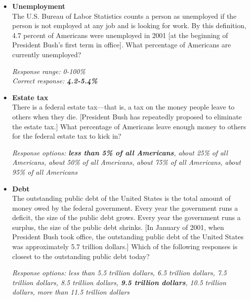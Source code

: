 \documentclass[12pt, letterpaper]{article}
\begin{document}
   \large {}

\normalsize
\begin{itemize}
\item \textbf{Unemployment} \\
The U.S. Bureau of Labor Statistics counts a person as unemployed if the person is not employed at any job and is looking for work. By this definition, 4.7 percent of Americans were unemployed in 2001 [at the beginning of President Bush's first term in office]. What percentage of Americans are currently unemployed?

\textit{Response range: 0-100\%} \\
\textit{Correct response: \textbf{4.2-5.4\%}} 
   \end{itemize}
   
\begin{itemize}
\item \textbf{Estate tax} \\
There is a federal estate tax---that is, a tax on the money people leave to others when they die. [President Bush has repeatedly proposed to eliminate the estate tax.] What percentage of Americans leave enough money to others for the federal estate tax to kick in?

\textit{Response options: \textbf{less than 5\% of all Americans}, about 25\% of all Americans, about 50\% of all Americans, about 75\% of all Americans, about 95\% of all Americans}
   \end{itemize}
   
   \begin{itemize}
\item \textbf{Debt} \\
The outstanding public debt of the United States is the total amount of money owed by the federal government. Every year the government runs a deficit, the size of the public debt grows. Every year the government runs a surplus, the size of the public debt shrinks. [In January of 2001, when President Bush took office, the outstanding public debt of the United States was approximately 5.7 trillion dollars.] Which of the following responses is closest to the outstanding public debt today? 

\textit{Response options: less than 5.5 trillion dollars, 6.5 trillion dollars, 7.5 trillion dollars, 8.5 trillion dollars, \textbf{9.5 trillion dollars}, 10.5 trillion dollars, more than 11.5 trillion dollars}
   \end{itemize}
 
\end{document}
